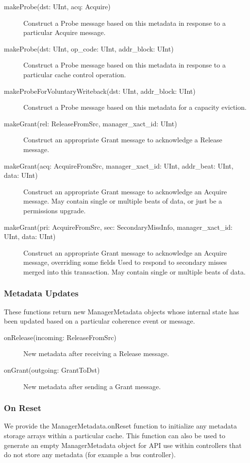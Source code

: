 \begin{description}
\item[makeProbe(dst: UInt, acq: Acquire) ]
Construct a Probe message based on this metadata in response to a particular Acquire message.
\item[makeProbe(dst: UInt, op\_code: UInt, addr\_block: UInt) ]
Construct a Probe message  based on this metadata in response to a particular cache control operation.
\item[makeProbeForVoluntaryWriteback(dst: UInt, addr\_block: UInt) ]
Construct a Probe message based on this metadata for a capacity eviction.
\item[makeGrant(rel: ReleaseFromSrc, manager\_xact\_id: UInt) ]
Construct an appropriate Grant message to acknowledge a Release message.
\item[makeGrant(acq: AcquireFromSrc, manager\_xact\_id: UInt, addr\_beat: UInt, data: UInt) ]
Construct an appropriate Grant message to acknowledge an Acquire message.
May contain single or multiple beats of data, or just be a permissions upgrade.
\item[makeGrant(pri: AcquireFromSrc, sec: SecondaryMissInfo, manager\_xact\_id: UInt, data: UInt) ]
Construct an appropriate Grant message to acknowledge an Acquire message, overriding some fields
Used to respond to secondary misses merged into this transaction.
May contain single or multiple beats of data.
\end{description}

\subsubsection{Metadata Updates}

These functions return new ManagerMetadata objects whose internal state has been updated based on a particular coherence event or message.

\begin{description}
\item[onRelease(incoming: ReleaseFromSrc) ]
New metadata after receiving a Release message.
\item[onGrant(outgoing: GrantToDst) ]
New metadata after sending a Grant message.
\end{description}

\subsubsection{On Reset}

We provide the ManagerMetadata.onReset function to initialize
any metadata storage arrays within a particular cache.
This function can also be used to generate an empty ManagerMetadata object for API 
use within controllers that do not store any metadata (for example a bus controller).

